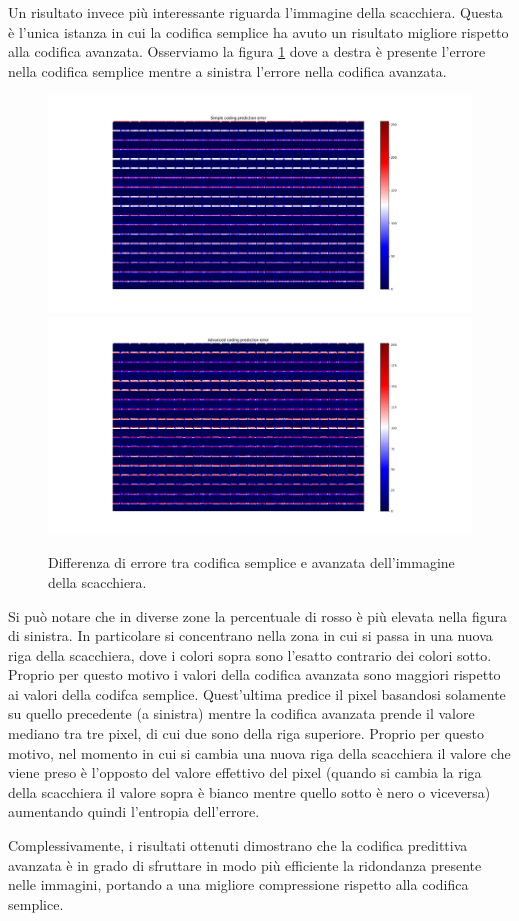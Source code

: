 Un risultato invece più interessante riguarda l'immagine della scacchiera. Questa è l'unica istanza in cui la codifica semplice ha avuto un risultato migliore rispetto alla codifica avanzata. Osserviamo la figura \ref{fig:chessboard} dove a destra è presente l'errore nella codifica semplice mentre a sinistra l'errore nella codifica avanzata. 
\begin{figure}[h]
    \centering
    \includegraphics[width = .49\textwidth]{hw-1/report/imgs/chessboard-simple.png}
    \includegraphics[width = .49\textwidth]{hw-1/report/imgs/chessboard-advanced.png}
    \caption{Differenza di errore tra codifica semplice e avanzata dell'immagine della scacchiera.}
    \label{fig:chessboard}
\end{figure}
Si può notare che in diverse zone la percentuale di rosso è più elevata nella figura di sinistra. In particolare si concentrano nella zona in cui si passa in una nuova riga della scacchiera, dove i colori sopra sono l'esatto contrario dei colori sotto. Proprio per questo motivo i valori della codifica avanzata sono maggiori rispetto ai valori della codifca semplice. Quest'ultima predice il pixel basandosi solamente su quello precedente (a sinistra) mentre la codifica avanzata prende il valore mediano tra tre pixel, di cui due sono della riga superiore. Proprio per questo motivo, nel momento in cui si cambia una nuova riga della scacchiera il valore che viene preso è l'opposto del valore effettivo del pixel (quando si cambia la riga della scacchiera il valore sopra è bianco mentre quello sotto è nero o viceversa) aumentando quindi l'entropia dell'errore.

\vspace{8px}\noindent Complessivamente, i risultati ottenuti dimostrano che la codifica predittiva avanzata è in grado di sfruttare in modo più efficiente la ridondanza presente nelle immagini, portando a una migliore compressione rispetto alla codifica semplice.




